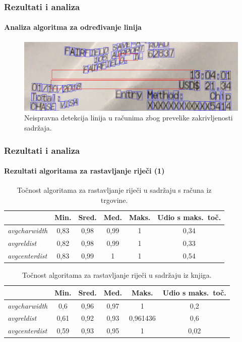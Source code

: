 \documentclass{beamer}
\begin{document}
\begin{frame}
\frametitle{Rezultati i analiza}
\framesubtitle{Analiza algoritma za određivanje linija}
\begin{figure}[htb]
    \centering
    \includegraphics[width=\textwidth]{images/error-01.png}
    \caption{Neispravna detekcija linija u računima zbog prevelike zakrivljenosti sadržaja.}
    \label{fig:error-01}
\end{figure}
\end{frame}
\begin{frame}
\frametitle{Rezultati i analiza}
\framesubtitle{Rezultati algoritama za rastavljanje riječi (1)}
\begin{table}[htb]
\caption{
    Točnost algoritama za rastavljanje riječi u sadržaju s računa iz trgovine.
}
\label{tbl:result-02}
\centering
\begin{tabular}{lccccc} \hline
& Min. & Sred. & Med. & Maks. & Udio s maks.\ toč. \\ \hline
\emph{avgcharwidth} & 0,83 & 0,98 & 0,99 & 1 & 0,34 \\
\emph{avgreldist} & 0,82 & 0,98 & 0,99 & 1 & 0,33 \\
\emph{avgcenterdist} & 0,83 & 0,99 & 1 & 1 & 0,54 \\ \hline
\end{tabular}
\end{table}

\begin{table}[htb]
\caption{Točnost algoritama za rastavljanje riječi u sadržaju iz knjiga.}
\label{tbl:result-03}
\centering
\begin{tabular}{lccccc} \hline
& Min. & Sred. & Med. & Maks. & Udio s maks.\ toč. \\ \hline
\emph{avgcharwidth} & 0,6 & 0,96 & 0,97 & 1 & 0,2 \\
\emph{avgreldist} & 0,61 & 0,92 & 0,93 & 0,961436 & 0,6 \\
\emph{avgcenterdist} & 0,59 & 0,93 & 0,95 & 1 & 0,02 \\ \hline
\end{tabular}
\end{table}
\end{frame}
\end{document}
